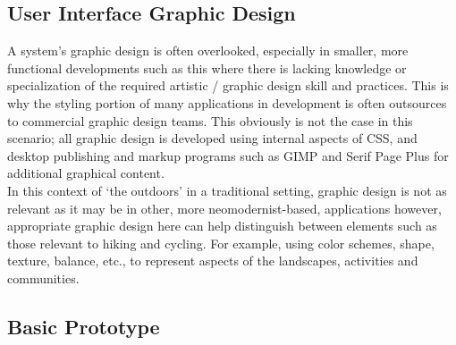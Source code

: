 \documentclass[11pt, english]{article}
\begin{document}
\begin{landscape}
\begin{center}
{}

	\end{center}

	\end{landscape}

\newpage

	\subsection{User Interface Graphic Design}

	A system's graphic design is often overlooked, especially in smaller, more functional developments such as this where there is lacking knowledge or specialization of the required artistic / graphic design skill and practices. This is why the styling portion of many applications in development is often outsources to commercial graphic design teams. This obviously is not the case in this scenario; all graphic design is developed using internal aspects of CSS, and desktop publishing and markup programs such as GIMP and Serif Page Plus for additional graphical content.\\

	In this context of `the outdoors' in a traditional setting, graphic design is not as relevant as it may be in other, more neomodernist-based, applications however, appropriate graphic design here can help distinguish between elements such as those relevant to hiking and cycling. For example, using color schemes, shape, texture, balance, etc., to represent aspects of the landscapes, activities and communities.

\newpage

	\subsection{Basic Prototype}
\end{document}
